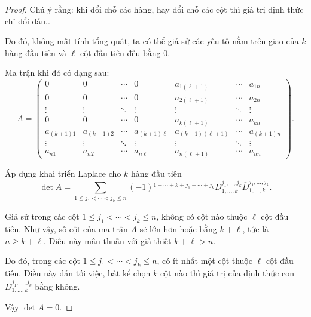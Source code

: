 \documentclass[class=nhvh-linear-algebra,crop=false]{standalone}
\begin{document}
\begin{proof}
    \par Chú ý rằng: khi đổi chỗ các hàng, hay đổi chỗ các cột thì giá trị định thức chỉ đổi dấu..
    \par Do đó, không mất tính tổng quát, ta có thể giả sử các yếu tố nằm trên giao của $k$ hàng đầu tiên và $\ell$ cột đầu tiên đều bằng 0.
    \par Ma trận khi đó có dạng sau:
    \[
        A=
        \begin{pmatrix}
            0          & 0          & \cdots & 0             & a_{1(\ell+1)}     & \cdots & a_{1n}     \\
            0          & 0          & \cdots & 0             & a_{2(\ell+1)}     & \cdots & a_{2n}     \\
            \vdots     & \vdots     & \ddots & \vdots        & \vdots            & \ddots & \vdots     \\
            0          & 0          & \cdots & 0             & a_{k(\ell+1)}     & \cdots & a_{kn}     \\
            a_{(k+1)1} & a_{(k+1)2} & \cdots & a_{(k+1)\ell} & a_{(k+1)(\ell+1)} & \cdots & a_{(k+1)n} \\
            \vdots     & \vdots     & \ddots & \vdots        & \vdots            & \ddots & \vdots     \\
            a_{n1}     & a_{n2}     & \cdots & a_{n\ell}     & a_{n(\ell+1)}     & \cdots & a_{nn}
        \end{pmatrix}.
    \]
    \par Áp dụng khai triển Laplace cho $k$ hàng đầu tiên
    \[
        \det A = \sum_{1\le j_{1} < \cdots < j_{k}\le n}(-1){}^{1+\cdots+k+j_{1}+\cdots+j_{k}}D_{1,\ldots,k}^{j_{1},\ldots,j_{k}}\overline{D}_{1,\ldots,k}^{j_{1},\ldots,j_{k}}.
    \]
    \par Giả sử trong các cột $1\le j_{1} < \cdots < j_{k}\le n$, không có cột nào thuộc $\ell$ cột đầu tiên. Như vậy, số cột của ma trận $A$ sẽ lớn hơn hoặc bằng $k + \ell$, tức là $n \ge k + \ell$. Điều này mâu thuẫn với giả thiết $k + \ell > n$.
    \par Do đó, trong các cột $1\le j_{1} < \cdots < j_{k}\le n$, có ít nhất một cột thuộc $\ell$ cột đầu tiên. Điều này dẫn tới việc, bất kể chọn $k$ cột nào thì giá trị của định thức con  $D^{j_{1},\ldots,j_{k}}_{1,\ldots,k}$ bằng không.
    \par Vậy $\det A = 0$.
\end{proof}
\end{document}
